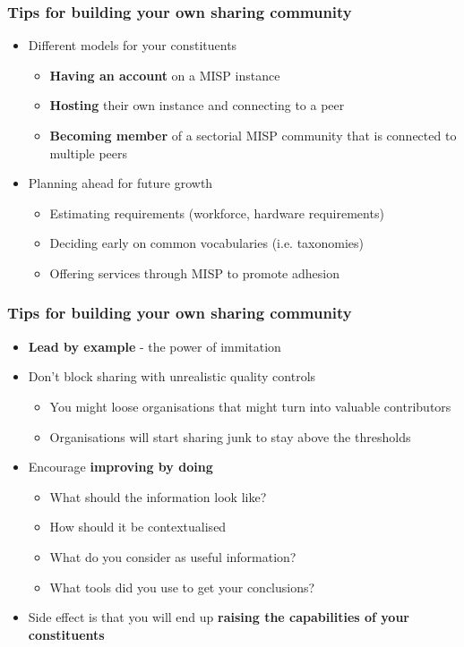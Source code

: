 \begin{frame}
    \frametitle{Tips for building your own sharing community}
    \begin{itemize}
        \item Different models for your constituents
        \begin{itemize}
            \item {\bf Having an account} on a MISP instance
            \item {\bf Hosting} their own instance and connecting to a peer
            \item {\bf Becoming member} of a sectorial MISP community that is connected to multiple peers
        \end{itemize}
        \item Planning ahead for future growth
        \begin{itemize}
            \item Estimating requirements (workforce, hardware requirements)
            \item Deciding early on common vocabularies (i.e. taxonomies)
            \item Offering services through MISP to promote adhesion
        \end{itemize}
    \end{itemize}
\end{frame}

\begin{frame}
    \frametitle{Tips for building your own sharing community}
    \begin{itemize}
        \item {\bf Lead by example} - the power of immitation
        \item Don't block sharing with unrealistic quality controls
        \begin{itemize}
            \item You might loose organisations that might turn into valuable contributors
            \item Organisations will start sharing junk to stay above the thresholds
        \end{itemize}
        \item Encourage {\bf improving by doing}
        \begin{itemize}
            \item What should the information look like?
            \item How should it be contextualised
            \item What do you consider as useful information?
            \item What tools did you use to get your conclusions?
        \end{itemize}
    \item Side effect is that you will end up {\bf raising the capabilities of your constituents}
    \end{itemize}
\end{frame}


